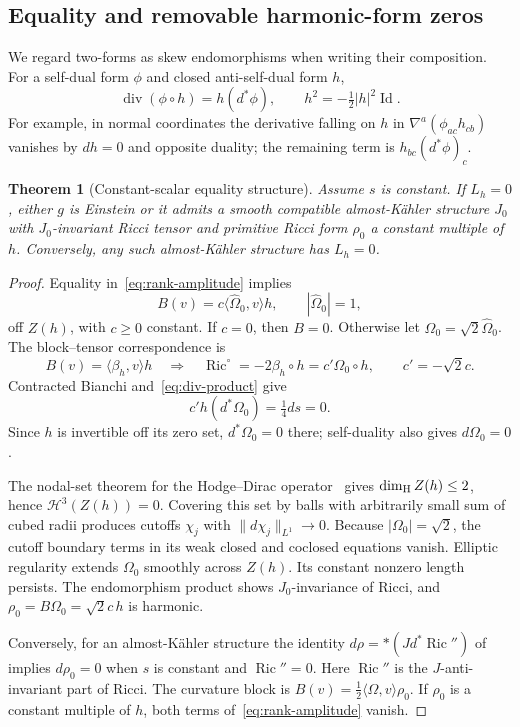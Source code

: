 \documentclass[11pt]{article}
\newcommand{\Ric}{\operatorname{Ric}}
\newcommand{\diver}{\operatorname{div}}
\newcommand{\Id}{\operatorname{Id}}
\newtheorem{theorem}{Theorem}[section]
\theoremstyle{definition}
\theoremstyle{remark}
\begin{document}
\subsection{Equality and removable harmonic-form zeros}
\label{sec:flux-equality}

We regard two-forms as skew endomorphisms when writing their composition.
For a self-dual form $\phi$ and closed anti-self-dual form $h$,
\begin{equation}
 \diver(\phi\circ h)=h(d^*\phi),\qquad
 h^2=-\tfrac12|h|^2\Id.
 \label{eq:div-product}
\end{equation}
For example, in normal coordinates the derivative falling on $h$ in
$\nabla^a(\phi_{ac}h_{cb})$ vanishes by $dh=0$ and opposite duality;
the remaining term is $h_{bc}(d^*\phi)_c$.

\begin{theorem}[Constant-scalar equality structure]
\label{thm:flux-equality}
Assume $s$ is constant. If $L_h=0$, either $g$ is Einstein or it admits a
smooth compatible almost-K\"ahler structure $J_0$ with $J_0$-invariant
Ricci tensor and primitive Ricci form $\rho_0$ a constant multiple of $h$.
Conversely, any such almost-K\"ahler structure has $L_h=0$.
\end{theorem}
\begin{proof}
Equality in~\eqref{eq:rank-amplitude} implies
\[
 B(v)=c\langle\widehat\Omega_0,v\rangle h,
 \qquad |\widehat\Omega_0|=1,
\]
off $Z(h)$, with $c\ge0$ constant. If $c=0$, then $B=0$.
Otherwise let $\Omega_0=\sqrt2\widehat\Omega_0$.
The block--tensor correspondence is
\[
 B(v)=\langle\beta_h,v\rangle h
 \quad\Longrightarrow\quad
 \Ric^\circ=-2\beta_h\circ h=c'\Omega_0\circ h,
 \qquad c'=-\sqrt2c.
\]
Contracted Bianchi and~\eqref{eq:div-product} give
\[
 c'h(d^*\Omega_0)=\tfrac14ds=0.
\]
Since $h$ is invertible off its zero set, $d^*\Omega_0=0$ there; self-duality
also gives $d\Omega_0=0$.

The nodal-set theorem for the Hodge--Dirac operator~\cite{Baer} gives
$\dim_{\rm H}Z(h)\le2$, hence $\mathcal H^3(Z(h))=0$.
Covering this set by balls with arbitrarily small sum of cubed radii
produces cutoffs $\chi_j$ with $\|d\chi_j\|_{L^1}\to0$.
Because $|\Omega_0|=\sqrt2$, the cutoff boundary terms in its weak closed
and coclosed equations vanish. Elliptic regularity extends $\Omega_0$
smoothly across $Z(h)$. Its constant nonzero length persists.
The endomorphism product shows $J_0$-invariance of Ricci, and
$\rho_0=B\Omega_0=\sqrt2c\,h$ is harmonic.

Conversely, for an almost-K\"ahler structure the identity
$d\rho=*(Jd^*\Ric'')$ of~\cite{AAD} implies $d\rho_0=0$ when
$s$ is constant and $\Ric''=0$. Here $\Ric''$ is the $J$-anti-invariant
part of Ricci. The curvature block is
$B(v)=\tfrac12\langle\Omega,v\rangle\rho_0$.
If $\rho_0$ is a constant multiple of $h$, both terms
of~\eqref{eq:rank-amplitude} vanish.
\end{proof}
\end{document}
